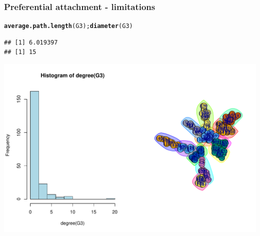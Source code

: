 \documentclass{beamer}\usepackage[]{graphicx}\usepackage[]{color}
\makeatletter
\newcommand{\hlstd}[1]{\textcolor[rgb]{0.345,0.345,0.345}{#1}}%
\newcommand{\hlkwd}[1]{\textcolor[rgb]{0.737,0.353,0.396}{\textbf{#1}}}%
\newenvironment{kframe}{%
 \def\at@end@of@kframe{}%
 \ifinner\ifhmode%
  \def\at@end@of@kframe{\end{minipage}}%
  \begin{minipage}{\columnwidth}%
 \fi\fi%
 \def\FrameCommand##1{\hskip\@totalleftmargin \hskip-\fboxsep
 \colorbox{shadecolor}{##1}\hskip-\fboxsep
     \hskip-\linewidth \hskip-\@totalleftmargin \hskip\columnwidth}%
 \MakeFramed {\advance\hsize-\width
   \@totalleftmargin\z@ \linewidth\hsize
   \@setminipage}}%
 {\par\unskip\endMakeFramed%
 \at@end@of@kframe}
\newenvironment{knitrout}{}{} %
\makeatother
\begin{document}
\begin{frame}[fragile]
  \frametitle{Preferential attachment - limitations}

\begin{knitrout}\scriptsize
{}\color{fgcolor}\begin{kframe}
\begin{alltt}
\hlkwd{average.path.length}\hlstd{(G3);} \hlkwd{diameter}\hlstd{(G3)}
\end{alltt}
\begin{verbatim}
## [1] 6.019397
## [1] 15
\end{verbatim}
\end{kframe}
\end{knitrout}

\begin{knitrout}\scriptsize
{}\color{fgcolor}
\includegraphics[width=.8\textwidth]{figures/PA_limitation2-1} 
\end{knitrout}
\end{frame}
\end{document}
